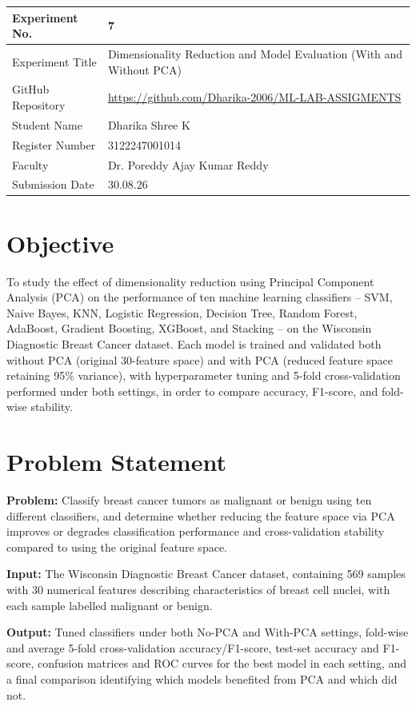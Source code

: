 \documentclass[12pt,a4paper]{article}
\begin{document}
\begin{tabular}{|p{4cm}|p{11cm}|}
\hline
Experiment No. & 7\\ \hline
Experiment Title & Dimensionality Reduction and Model Evaluation (With and Without PCA)\\ \hline
GitHub Repository & \url{https://github.com/Dharika-2006/ML-LAB-ASSIGMENTS} \\ \hline
Student Name & Dharika Shree K\\ \hline
Register Number & 3122247001014\\ \hline
Faculty & Dr. Poreddy Ajay Kumar Reddy \\ \hline
Submission Date & 30.08.26\\ \hline
\end{tabular}
\section{Objective}
To study the effect of dimensionality reduction using Principal Component Analysis (PCA) on the performance of ten machine learning classifiers -- SVM, Naive Bayes, KNN, Logistic Regression, Decision Tree, Random Forest, AdaBoost, Gradient Boosting, XGBoost, and Stacking -- on the Wisconsin Diagnostic Breast Cancer dataset. Each model is trained and validated both without PCA (original 30-feature space) and with PCA (reduced feature space retaining 95\% variance), with hyperparameter tuning and 5-fold cross-validation performed under both settings, in order to compare accuracy, F1-score, and fold-wise stability.

\section{Problem Statement}
\textbf{Problem:} Classify breast cancer tumors as malignant or benign using ten different classifiers, and determine whether reducing the feature space via PCA improves or degrades classification performance and cross-validation stability compared to using the original feature space.

\textbf{Input:} The Wisconsin Diagnostic Breast Cancer dataset, containing 569 samples with 30 numerical features describing characteristics of breast cell nuclei, with each sample labelled malignant or benign.

\textbf{Output:} Tuned classifiers under both No-PCA and With-PCA settings, fold-wise and average 5-fold cross-validation accuracy/F1-score, test-set accuracy and F1-score, confusion matrices and ROC curves for the best model in each setting, and a final comparison identifying which models benefited from PCA and which did not.
\end{document}
